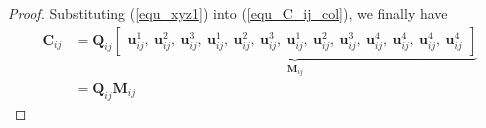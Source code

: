 \documentclass{vgtc}                          %
\begin{document}
\begin{proof}
	Substituting (\ref{equ_xyz1}) into (\ref{equ_C_ij_col}), we finally have 
	\begin{equation} \label{equ_C_ij_QijMij}
		\begin{split}
			\mathbf{C}_{ij} &  =\mathbf{Q}_{ij}\underbrace{\begin{bmatrix}
				\mathbf{u}_{ij}^{1} , \  \mathbf{u}_{ij}^{2}, \ \mathbf{u}_{ij}^{3}, \ \mathbf{u}_{ij}^{1}, \  \mathbf{u}_{ij}^{2}, \ \mathbf{u}_{ij}^{3}, \  \mathbf{u}_{ij}^{1}, \  \mathbf{u}_{ij}^{2}, \ \mathbf{u}_{ij}^{3}, \  \mathbf{u}_{ij}^{4}, \  \mathbf{u}_{ij}^{4}, \  \mathbf{u}_{ij}^{4}, \  \mathbf{u}_{ij}^{4}
				\end{bmatrix}}_{\mathbf{M}_{ij}} \\
			&= \mathbf{Q}_{ij}\mathbf{M}_{ij}
		\end{split}
	\end{equation}
	 

\end{proof}
\end{document}
